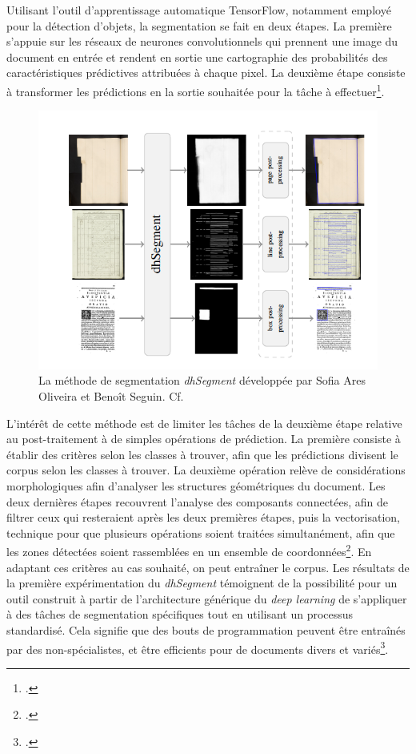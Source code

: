 \documentclass[a4paper,12pt,twoside]{book}
\begin{document}
    Utilisant l'outil d'apprentissage automatique TensorFlow, notamment employé pour la détection d'objets, la segmentation se fait en deux étapes. La première s'appuie sur les réseaux de neurones convolutionnels qui prennent une image du document en entrée et rendent en sortie une cartographie des probabilités des caractéristiques prédictives attribuées à chaque pixel. La deuxième étape consiste à transformer les prédictions en la sortie souhaitée pour la tâche à effectuer\footcite[p. 1-2]{deep_learning_segmentation}. 
    
    \begin{figure}[!h]
    \centering
    \includegraphics[width=13cm]{img/ML/etapes_dhSegment.png}
    \caption{La méthode de segmentation \textit{dhSegment} développée par Sofia Ares Oliveira et Benoît Seguin. Cf. \cite[p. 2]{deep_learning_segmentation}}
    \end{figure}
    
    L'intérêt de cette méthode est de limiter les tâches de la deuxième étape relative au post-traitement à de simples opérations de prédiction. La première consiste à établir des critères selon les classes à trouver, afin que les prédictions divisent le corpus selon les classes à trouver. La deuxième opération relève de considérations morphologiques afin d'analyser les structures géométriques du document. Les deux dernières étapes recouvrent l'analyse des composants connectées, afin de filtrer ceux qui resteraient après les deux premières étapes, puis la vectorisation, technique pour que plusieurs opérations soient traitées simultanément, afin que les zones détectées soient rassemblées en un ensemble de coordonnées\footcite[p. 2]{deep_learning_segmentation}. En adaptant ces critères au cas souhaité, on peut entraîner le corpus. Les résultats de la première expérimentation du \textit{dhSegment} témoignent de la possibilité pour un outil construit à partir de l'architecture générique du \textit{deep learning} de s'appliquer à des tâches de segmentation spécifiques tout en utilisant un processus standardisé. Cela signifie que des bouts de programmation peuvent être entraînés par des non-spécialistes, et être efficients pour de documents divers et variés\footcite[p. 6]{deep_learning_segmentation}. 
    
\end{document}
